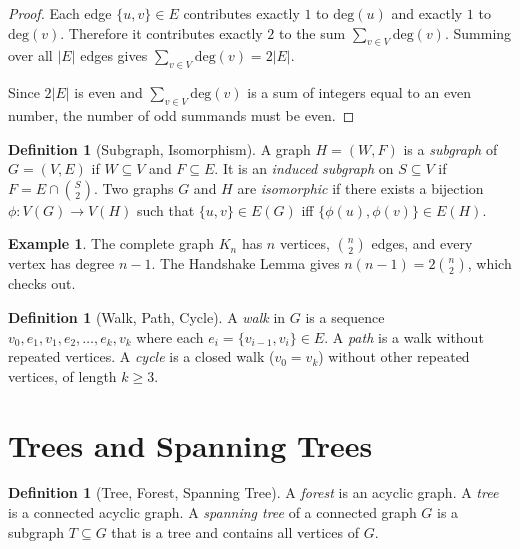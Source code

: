 \documentclass[12pt,a4paper]{amsart}
\theoremstyle{definition}
\newtheorem{definition}[theorem]{Definition}
\newtheorem{example}[theorem]{Example}
\theoremstyle{remark}
\newcommand{\degv}{\mathrm{deg}}
\begin{document}
\begin{proof}
Each edge $\{u, v\} \in E$ contributes exactly $1$ to $\degv(u)$ and exactly
$1$ to $\degv(v)$. Therefore it contributes exactly $2$ to the sum
$\sum_{v \in V} \degv(v)$. Summing over all $|E|$ edges gives
$\sum_{v \in V} \degv(v) = 2|E|$.

Since $2|E|$ is even and $\sum_{v \in V} \degv(v)$ is a sum of integers equal
to an even number, the number of odd summands must be even.
\end{proof}

\begin{definition}[Subgraph, Isomorphism]
A graph $H = (W, F)$ is a \emph{subgraph} of $G = (V, E)$ if $W \subseteq V$
and $F \subseteq E$. It is an \emph{induced subgraph} on $S \subseteq V$ if
$F = E \cap \binom{S}{2}$. Two graphs $G$ and $H$ are \emph{isomorphic} if
there exists a bijection $\phi: V(G) \to V(H)$ such that $\{u,v\} \in E(G)$
iff $\{\phi(u), \phi(v)\} \in E(H)$.
\end{definition}

\begin{example}
The complete graph $K_n$ has $n$ vertices, $\binom{n}{2}$ edges, and every
vertex has degree $n-1$. The Handshake Lemma gives
$n(n-1) = 2\binom{n}{2}$, which checks out.
\end{example}

\begin{definition}[Walk, Path, Cycle]
A \emph{walk} in $G$ is a sequence $v_0, e_1, v_1, e_2, \ldots, e_k, v_k$
where each $e_i = \{v_{i-1}, v_i\} \in E$. A \emph{path} is a walk without
repeated vertices. A \emph{cycle} is a closed walk ($v_0 = v_k$) without
other repeated vertices, of length $k \ge 3$.
\end{definition}

\section{Trees and Spanning Trees}
\label{sec:trees}

\begin{definition}[Tree, Forest, Spanning Tree]
A \emph{forest} is an acyclic graph. A \emph{tree} is a connected acyclic
graph. A \emph{spanning tree} of a connected graph $G$ is a subgraph
$T \subseteq G$ that is a tree and contains all vertices of $G$.
\end{definition}
\end{document}
